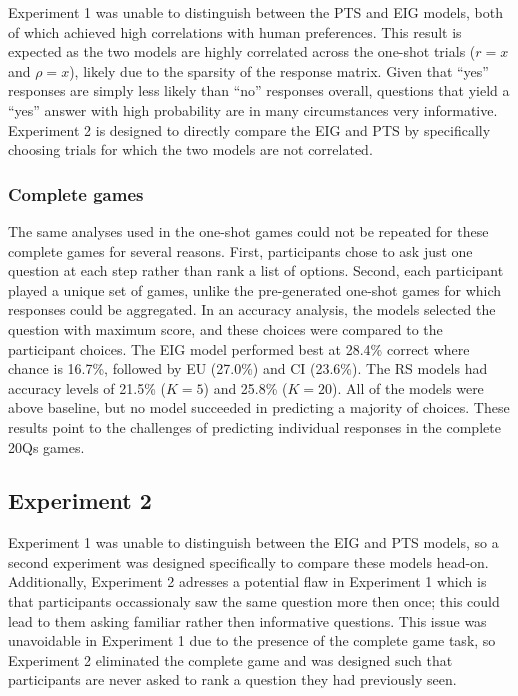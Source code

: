 \documentclass[11pt,letterpaper]{article}
\begin{document}
Experiment 1 was unable to distinguish between the PTS and EIG models, both of which achieved high correlations with human preferences. This result is expected as the two models are highly correlated across the one-shot trials ($r=x$ and $\rho=x$), likely due to the sparsity of the response matrix. Given that ``yes'' responses are simply less likely than ``no'' responses overall, questions that yield a ``yes'' answer with high probability are in many circumstances very informative. Experiment 2 is designed to directly compare the EIG and PTS by specifically choosing trials for which the two models are not correlated.


\subsubsection* {Complete games}
The same analyses used in the one-shot games could not be repeated for these complete games for several reasons.
First, participants chose to ask just one question at each step rather than rank a list of options.
Second, each participant played a unique set of games, unlike the pre-generated one-shot games for which responses could be aggregated.
In an accuracy analysis, the models selected the question with maximum score, and these choices were compared to the participant choices.
The EIG model performed best at 28.4\% correct where chance is 16.7\%, followed by EU (27.0\%) and CI (23.6\%).
The RS models had accuracy levels of 21.5\% ($K=5$) and 25.8\% ($K=20$).
All of the models were above baseline, but no model succeeded in predicting a majority of choices.
These results point to the challenges of predicting individual responses in the complete 20Qs games.


\subsection*{Experiment 2}
Experiment 1 was unable to distinguish between the EIG and PTS models, so a second experiment was designed specifically to compare these models head-on.
Additionally, Experiment 2 adresses a potential flaw in Experiment 1 which is that participants occassionaly saw the same question more then once; this could lead to them asking familiar rather then informative questions. 
This issue was unavoidable in Experiment 1 due to the presence of the complete game task, so Experiment 2 eliminated the complete game and was designed such that participants are never asked to rank a question they had previously seen.
\end{document}
